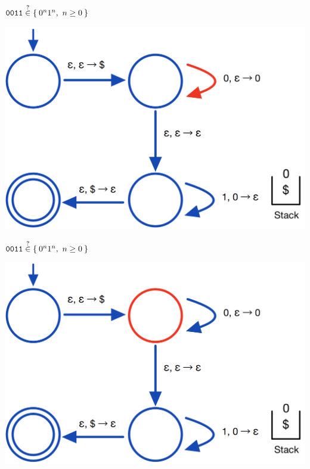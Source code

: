 \documentclass[aspectratio=169]{beamer}
\begin{document}
\begin{frame}{$\texttt{0011} \stackrel{?}{\in} \Set{0^n 1^n,\ n \geq 0}$}
    \begin{center}
        \includegraphics[scale=0.30]{images/pda_comp/PDA_Comp_4.png}
    \end{center}
\end{frame}

\begin{frame}{$\texttt{0011} \stackrel{?}{\in} \Set{0^n 1^n,\ n \geq 0}$}
    \begin{center}
        \includegraphics[scale=0.30]{images/pda_comp/PDA_Comp_5.png}
    \end{center}
\end{frame}
\end{document}
